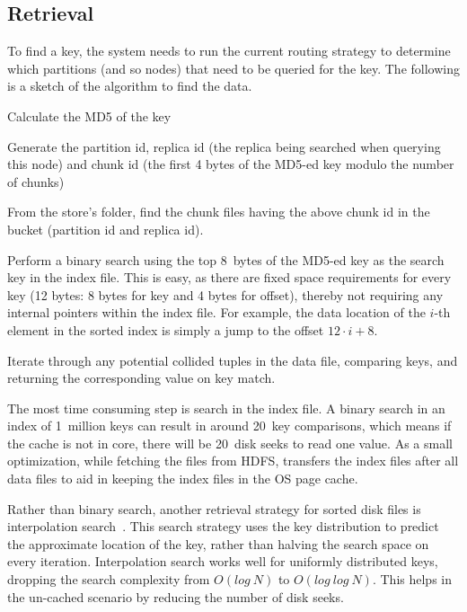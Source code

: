 
\subsection{Retrieval}
\label{sec:read_only:search}

To find a key, the system needs to run the current routing strategy to
determine which partitions (and so nodes) that need to be queried for
the key. The following is a sketch of the algorithm to find the data. 

\begin{compactenum}
  \item Calculate the MD5 of the key
  \item Generate the partition id, replica id (the replica being
searched when querying this node) and chunk id (the first 4 bytes of
the MD5-ed key modulo the number of chunks)
  \item From the store's folder, find the chunk files having the above
chunk id in the bucket (partition id and replica id). 
  \item Perform a binary search using the top 8~bytes of the MD5-ed
key as the search key in the index file. This is easy, as there are
fixed space requirements for every key (12 bytes: 8 bytes for key and
4 bytes for offset), thereby not requiring any internal pointers
within the index file. For example, the data location of the $i$-th
element in the sorted index is simply a jump to
the offset $12 \cdot i + 8$.  
  \item Iterate through any potential collided tuples in the data
file, comparing keys, and returning the corresponding value on key
match. 
\end{compactenum}

The most time consuming step is search in the index file. A binary
search in an index of 1~million keys can result in around 20~key
comparisons, which means if the cache is not in core, there will be
20~disk seeks to read one value. As a small optimization, while
fetching the files from HDFS, \projectname{} transfers the index files
after all data files to aid in keeping the index files in the OS page
cache.

Rather than binary search, another retrieval strategy for sorted disk
files is interpolation search~\cite{manolopoulos}. This search
strategy uses the key distribution to predict the approximate location
of the key, rather than halving the search space on every iteration.
Interpolation search works well for uniformly distributed keys,
dropping the search complexity from $O(log~N)$ to $O(log~log~N)$. This
helps in the un-cached scenario by reducing the number of disk seeks.

